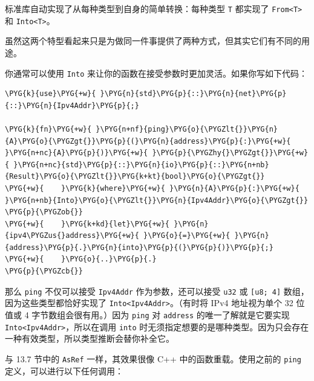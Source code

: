 标准库自动实现了从每种类型到自身的简单转换：每种类型 \texttt{T} 都实现了 \texttt{From<T>} 和 \texttt{Into<T>}。

虽然这两个特型看起来只是为做同一件事提供了两种方式，但其实它们有不同的用途。

你通常可以使用 \texttt{Into} 来让你的函数在接受参数时更加灵活。如果你写如下代码：

\begin{Verbatim}[commandchars=\\\{\},breaklines=true,breakanywhere=true,fontsize=\codefont,xleftmargin=17bp]
\PYG{k}{use}\PYG{+w}{ }\PYG{n}{std}\PYG{p}{::}\PYG{n}{net}\PYG{p}{::}\PYG{n}{Ipv4Addr}\PYG{p}{;}

\PYG{k}{fn}\PYG{+w}{ }\PYG{n+nf}{ping}\PYG{o}{\PYGZlt{}}\PYG{n}{A}\PYG{o}{\PYGZgt{}}\PYG{p}{(}\PYG{n}{address}\PYG{p}{:}\PYG{+w}{ }\PYG{n+nc}{A}\PYG{p}{)}\PYG{+w}{ }\PYG{p}{\PYGZhy{}\PYGZgt{}}\PYG{+w}{ }\PYG{n+nc}{std}\PYG{p}{::}\PYG{n}{io}\PYG{p}{::}\PYG{n+nb}{Result}\PYG{o}{\PYGZlt{}}\PYG{k+kt}{bool}\PYG{o}{\PYGZgt{}}
\PYG{+w}{    }\PYG{k}{where}\PYG{+w}{ }\PYG{n}{A}\PYG{p}{:}\PYG{+w}{ }\PYG{n+nb}{Into}\PYG{o}{\PYGZlt{}}\PYG{n}{Ipv4Addr}\PYG{o}{\PYGZgt{}}
\PYG{p}{\PYGZob{}}
\PYG{+w}{    }\PYG{k+kd}{let}\PYG{+w}{ }\PYG{n}{ipv4\PYGZus{}address}\PYG{+w}{ }\PYG{o}{=}\PYG{+w}{ }\PYG{n}{address}\PYG{p}{.}\PYG{n}{into}\PYG{p}{(}\PYG{p}{)}\PYG{p}{;}
\PYG{+w}{    }\PYG{o}{..}\PYG{p}{.}
\PYG{p}{\PYGZcb{}}
\end{Verbatim}

那么 \texttt{ping} 不仅可以接受 \texttt{Ipv4Addr} 作为参数，还可以接受 \texttt{u32} 或 \texttt{[u8; 4]} 数组，因为这些类型都恰好实现了 \texttt{Into<Ipv4Addr>}。（有时将 IPv4 地址视为单个 32 位值或 4 字节数组会很有用。）因为 \texttt{ping} 对 \texttt{address} 的唯一了解就是它要实现 \texttt{Into<Ipv4Addr>}，所以在调用 \texttt{into} 时无须指定想要的是哪种类型。因为只会存在一种有效类型，所以类型推断会替你补全它。

与 13.7 节中的 \texttt{AsRef} 一样，其效果很像 C++ 中的函数重载。使用之前的 \texttt{ping} 定义，可以进行以下任何调用：

